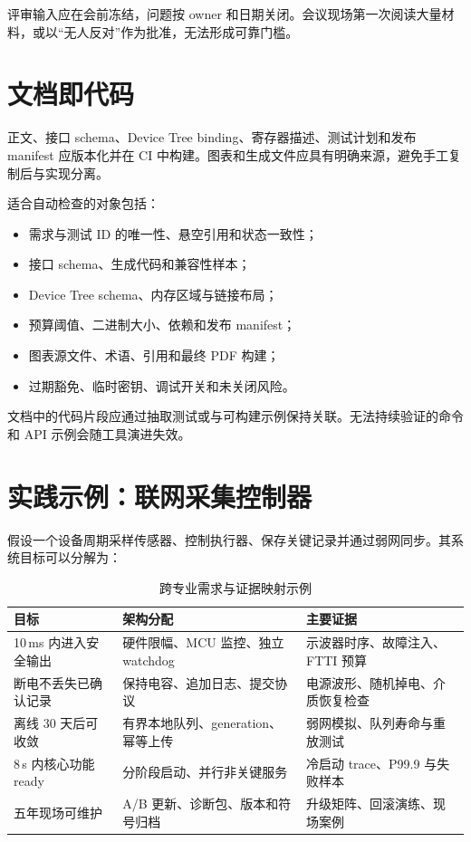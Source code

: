 评审输入应在会前冻结，问题按 owner 和日期关闭。会议现场第一次阅读大量材料，或以“无人反对”作为批准，无法形成可靠门槛。

\section{文档即代码}

正文、接口 schema、Device Tree binding、寄存器描述、测试计划和发布 manifest 应版本化并在 CI 中构建。图表和生成文件应具有明确来源，避免手工复制后与实现分离。

适合自动检查的对象包括：

\begin{itemize}
  \item 需求与测试 ID 的唯一性、悬空引用和状态一致性；
  \item 接口 schema、生成代码和兼容性样本；
  \item Device Tree schema、内存区域与链接布局；
  \item 预算阈值、二进制大小、依赖和发布 manifest；
  \item 图表源文件、术语、引用和最终 PDF 构建；
  \item 过期豁免、临时密钥、调试开关和未关闭风险。
\end{itemize}

文档中的代码片段应通过抽取测试或与可构建示例保持关联。无法持续验证的命令和 API 示例会随工具演进失效。

\section{实践示例：联网采集控制器}

假设一个设备周期采样传感器、控制执行器、保存关键记录并通过弱网同步。其系统目标可以分解为：

\begin{table}[H]
  \centering
  \caption{跨专业需求与证据映射示例}
  \begin{tabular}{p{30mm}p{48mm}p{60mm}}
    \hline
    目标 & 架构分配 & 主要证据 \\
    \hline
    10\,ms 内进入安全输出 & 硬件限幅、MCU 监控、独立 watchdog & 示波器时序、故障注入、FTTI 预算 \\
    断电不丢失已确认记录 & 保持电容、追加日志、提交协议 & 电源波形、随机掉电、介质恢复检查 \\
    离线 30 天后可收敛 & 有界本地队列、generation、幂等上传 & 弱网模拟、队列寿命与重放测试 \\
    8\,s 内核心功能 ready & 分阶段启动、并行非关键服务 & 冷启动 trace、P99.9 与失败样本 \\
    五年现场可维护 & A/B 更新、诊断包、版本和符号归档 & 升级矩阵、回滚演练、现场案例 \\
    \hline
  \end{tabular}
\end{table}


